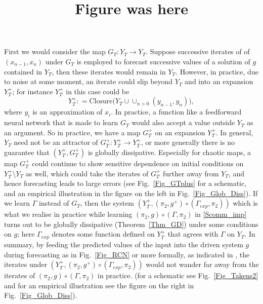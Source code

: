 \documentclass[12 pt]{article}
\begin{document}
First we would consider the map $G_T: Y_T \to Y_T$. 
Suppose successive iterates of  of $(x_{n-1},x_{n})$ under $G_T$ is employed to forecast successive values of a solution of $g$ contained in $Y_T$, then these iterates would remain in $Y_T$. However, in practice, due to noise at some moment, an iterate could slip beyond $Y_T$ and into an 
expansion $Y_T^+$; for instance $Y_T^+$ in this case could be 
$$Y_T^+ : = \mbox{Closure}\bigg(Y_T \cup \cup_{n > 0 } (y_{n-1},y_{n})\bigg),$$  where $y_i$ is an approximation of $x_i$.  
In practice, a function like a feedforward neural network that is made to learn $G_T$ would also accept a value outside $Y_T$ as an argument.  So in practice, we have a map $G_T^+$ on an expansion $Y_T^+$. In general, $Y_T$ need not be an attractor of $G_T^+: Y_T^+ \to Y_T^+$, or more generally there is no guarantee that $(Y_T^+,G_T^+)$ is globally dissipative. Especially for chaotic maps, a map $G_T^+$ could continue to show sensitive dependence on initial conditions on $Y_T^+\setminus Y_T$ as well, which could take the iterates of $G_T^+$ further away from $Y_T$, and hence forecasting leads to large errors (see Fig.~\ref{Fig_GTplus} for a schematic, and an empirical illustration in the figure on the left in Fig.~\ref{Fig_Glob_Diss}). If we learn $\Gamma$ instead of $G_T$, then the system $(Y_T^+, (\pi_2,g^+) \circ (\Gamma_{exp},\pi_2))$ which is what we realise in practice while learning $(\pi_2,g) \circ (\Gamma,\pi_2)$ in \eqref{Scomm_imp} turns out to be globally dissipative (Theorem~\ref{Thm_GD}) under some conditions on $g$; here $\Gamma_{exp}$ denotes some function defined on $Y_T^+$ that agrees with $\Gamma$ on $Y_T$. In summary, by feeding the predicted values of the input into the driven system $g$ during forecasting as in Fig.~\ref{Fig_RCN} or more formally, as indicated in  \cite[Fig.~\ref{Fig_1}A]{Main_article}, the iterates under   
$(Y_T^+, (\pi_2,g^+) \circ (\Gamma_{exp},\pi_2))$ would not wander far away from the iterates of $(\pi_2,g) \circ (\Gamma,\pi_2)$ in practice. (for a schematic see Fig.~\ref{Fig_Takens2} and for 
an empirical illustration see the figure on the right in Fig.~\ref{Fig_Glob_Diss}).


\title{Figure was here}
\end{document}
